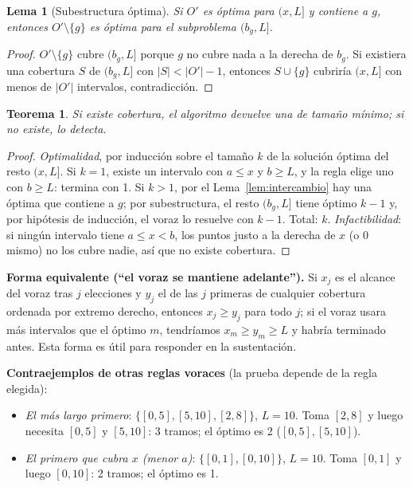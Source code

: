 \documentclass[11pt,letterpaper]{article}
\theoremstyle{plain}
\newtheorem{teorema}{Teorema}
\newtheorem{lema}{Lema}
\theoremstyle{definition}
\begin{document}
\begin{lema}[Subestructura óptima]
Si $O'$ es óptima para $(x,L]$ y contiene a $g$, entonces $O'\setminus\{g\}$ es óptima para
el subproblema $(b_g,L]$.
\end{lema}
\begin{proof}
$O'\setminus\{g\}$ cubre $(b_g,L]$ porque $g$ no cubre nada a la derecha de $b_g$. Si existiera una
cobertura $S$ de $(b_g,L]$ con $|S|<|O'|-1$, entonces $S\cup\{g\}$ cubriría $(x,L]$ con menos de
$|O'|$ intervalos, contradicción.
\end{proof}

\begin{teorema}
Si existe cobertura, el algoritmo devuelve una de tamaño mínimo; si no existe, lo detecta.
\end{teorema}
\begin{proof}
\emph{Optimalidad}, por inducción sobre el tamaño $k$ de la solución óptima del resto $(x,L]$. Si
$k=1$, existe un intervalo con $a\le x$ y $b\ge L$, y la regla elige uno con $b\ge L$: termina con 1.
Si $k>1$, por el Lema~\ref{lem:intercambio} hay una óptima que contiene a $g$; por subestructura,
el resto $(b_g,L]$ tiene óptimo $k-1$ y, por hipótesis de inducción, el voraz lo resuelve con
$k-1$. Total: $k$. \emph{Infactibilidad}: si ningún intervalo tiene $a\le x<b$, los puntos justo a
la derecha de $x$ (o $0$ mismo) no los cubre nadie, así que no existe cobertura.
\end{proof}

\textbf{Forma equivalente (``el voraz se mantiene adelante'').} Si $x_j$ es el alcance del voraz tras
$j$ elecciones y $y_j$ el de las $j$ primeras de cualquier cobertura ordenada por extremo derecho,
entonces $x_j\ge y_j$ para todo $j$; si el voraz usara más intervalos que el óptimo $m$, tendríamos
$x_m\ge y_m\ge L$ y habría terminado antes. Esta forma es útil para responder en la sustentación.

\textbf{Contraejemplos de otras reglas voraces} (la prueba depende de la regla elegida):
\begin{itemize}
  \item \emph{El más largo primero}: $\{[0,5],[5,10],[2,8]\}$, $L=10$. Toma $[2,8]$ y luego necesita
  $[0,5]$ y $[5,10]$: 3 tramos; el óptimo es 2 ($[0,5],[5,10]$).
  \item \emph{El primero que cubra $x$ (menor $a$)}: $\{[0,1],[0,10]\}$, $L=10$. Toma $[0,1]$ y luego
  $[0,10]$: 2 tramos; el óptimo es 1.
\end{itemize}
\end{document}
